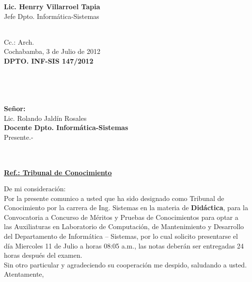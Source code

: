 \documentclass[letterpaper,11pt]{letter}
\begin{document}
\vspace{3.5cm}
\begin{center}
\begin{minipage}[b]{0.5\textwidth}
\begin{center}
{\bf Lic. Henrry Villarroel Tapia}\\
Jefe Dpto. Informática-Sistemas\\
\end{center}
\end{minipage}
\end{center}
~\\
Cc.: Arch.\\
\newpage
Cochabamba, 3 de Julio de 2012~\\
 \textbf{DPTO. INF-SIS 147/2012}\\
~\\
~\\
~\\
~\\
 \textbf{Señor:}~\\
Lic. Rolando Jaldín Rosales~\\
 \textbf{Docente Dpto. Informática-Sistemas}~\\
Presente.-\\
~\\
~\\
\begin{center}
\underline{ \textbf{Ref.: Tribunal de Conocimiento}}
\end{center}
De mi consideración:\\
Por la presente comunico a usted que ha sido designado como Tribunal de Conocimiento por la carrera de Ing. Sistemas en la materia de \textbf{Didáctica}, para la Convocatoria a Concurso de Méritos y Pruebas de Conocimientos para optar a las Auxiliaturas en Laboratorio de Computación, de Mantenimiento y Desarrollo del Departamento de Informática – Sistemas, por lo cual solicito presentarse el día Miercoles 11 de Julio a horas 08:05 a.m., las notas deberán ser entregadas 24 horas después del examen.\\
Sin otro particular y agradeciendo su cooperación me despido, saludando a usted.\\
Atentamente,\\
\end{document}
